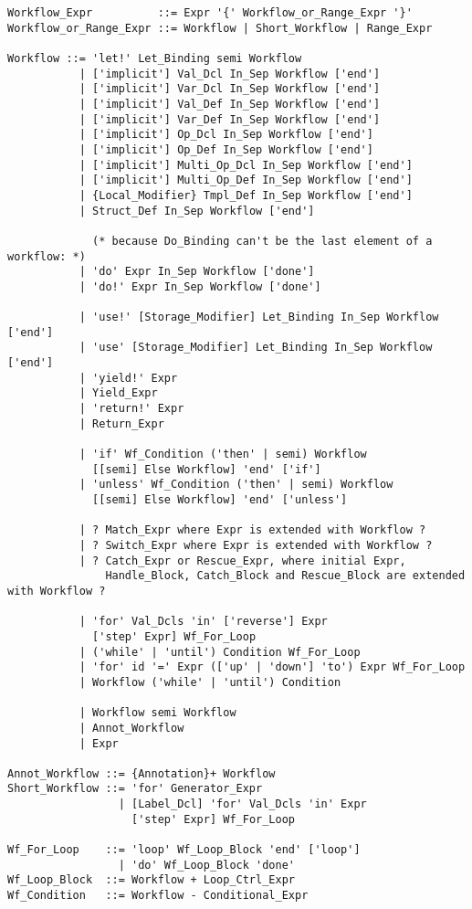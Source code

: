 \grammar\begin{lstlisting}[deletekeywords={is,with,or,is,and}]
Workflow_Expr          ::= Expr '{' Workflow_or_Range_Expr '}'
Workflow_or_Range_Expr ::= Workflow | Short_Workflow | Range_Expr

Workflow ::= 'let!' Let_Binding semi Workflow
           | ['implicit'] Val_Dcl In_Sep Workflow ['end']
           | ['implicit'] Var_Dcl In_Sep Workflow ['end']
           | ['implicit'] Val_Def In_Sep Workflow ['end']
           | ['implicit'] Var_Def In_Sep Workflow ['end']
           | ['implicit'] Op_Dcl In_Sep Workflow ['end']
           | ['implicit'] Op_Def In_Sep Workflow ['end']
           | ['implicit'] Multi_Op_Dcl In_Sep Workflow ['end']
           | ['implicit'] Multi_Op_Def In_Sep Workflow ['end']
           | {Local_Modifier} Tmpl_Def In_Sep Workflow ['end']
           | Struct_Def In_Sep Workflow ['end']
           
             (* because Do_Binding can't be the last element of a workflow: *)
           | 'do' Expr In_Sep Workflow ['done'] 
           | 'do!' Expr In_Sep Workflow ['done']
           
           | 'use!' [Storage_Modifier] Let_Binding In_Sep Workflow ['end']
           | 'use' [Storage_Modifier] Let_Binding In_Sep Workflow ['end']
           | 'yield!' Expr
           | Yield_Expr
           | 'return!' Expr
           | Return_Expr
           
           | 'if' Wf_Condition ('then' | semi) Workflow
             [[semi] Else Workflow] 'end' ['if']
           | 'unless' Wf_Condition ('then' | semi) Workflow
             [[semi] Else Workflow] 'end' ['unless']
             
           | ? Match_Expr where Expr is extended with Workflow ?
           | ? Switch_Expr where Expr is extended with Workflow ?
           | ? Catch_Expr or Rescue_Expr, where initial Expr, 
               Handle_Block, Catch_Block and Rescue_Block are extended with Workflow ?
           
           | 'for' Val_Dcls 'in' ['reverse'] Expr
             ['step' Expr] Wf_For_Loop
           | ('while' | 'until') Condition Wf_For_Loop
           | 'for' id '=' Expr (['up' | 'down'] 'to') Expr Wf_For_Loop
           | Workflow ('while' | 'until') Condition
           
           | Workflow semi Workflow
           | Annot_Workflow
           | Expr

Annot_Workflow ::= {Annotation}+ Workflow           
Short_Workflow ::= 'for' Generator_Expr
                 | [Label_Dcl] 'for' Val_Dcls 'in' Expr 
                   ['step' Expr] Wf_For_Loop

Wf_For_Loop    ::= 'loop' Wf_Loop_Block 'end' ['loop']
                 | 'do' Wf_Loop_Block 'done'
Wf_Loop_Block  ::= Workflow + Loop_Ctrl_Expr
Wf_Condition   ::= Workflow - Conditional_Expr
\end{lstlisting}

